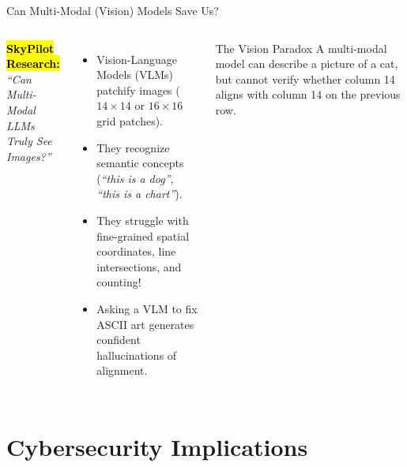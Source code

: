 \documentclass[aspectratio=169,11pt,xcolor={table,dvipsnames}]{beamer}
\begin{document}
\begin{frame}[t]{Can Multi-Modal (Vision) Models Save Us?}
  \begin{columns}[T]
      \textbf{\hl{SkyPilot Research:}} \\
      \textit{\small ``Can Multi-Modal LLMs Truly See Images?''}%
      \begin{itemize}
        \small
        \item Vision-Language Models (VLMs) patchify images ($14 \times 14$ or $16 \times 16$ grid patches).
        \item They recognize semantic concepts (\textit{``this is a dog''}, \textit{``this is a chart''}).
        \item They struggle with fine-grained spatial coordinates, line intersections, and counting!
        \item Asking a VLM to fix ASCII art generates confident hallucinations of alignment.
      \end{itemize}

      \begin{alertblock}{The Vision Paradox}
        \small
        A multi-modal model can describe a picture of a cat, but cannot verify whether column 14 aligns with column 14 on the previous row.
      \end{alertblock}
      \vspace{0.2cm}
      \centering
      \scriptsize{}
  \end{columns}
\end{frame}

\section{Cybersecurity Implications}
\end{document}

